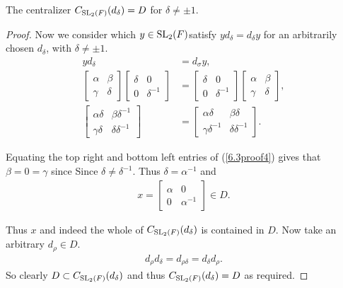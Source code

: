 \begin{proposition}
    \label{centralizer_d_eq_D}
    \leanok
    The centralizer $C_{\operatorname{SL}_2(F)}(d_\delta) = D$ for $\delta \neq \pm 1$.
    \end{proposition}        
\begin{proof}
    \leanok
Now we consider which $y \in \operatorname{SL}_2(F)$satisfy $y d_\delta = d_\delta y$ for an arbitrarily chosen $d_\delta$, with $\delta \neq \pm 1$.
\begin{align}\label{6.3proof4} y d_ \delta &= d_\sigma y, \nonumber \\[1.5ex]
\begin{bmatrix} \alpha & \beta \\ \gamma & \delta \end{bmatrix} \begin{bmatrix} \delta & 0 \\ 0 & \delta^{-1} \end{bmatrix} &= \begin{bmatrix} \delta & 0 \\ 0 & \delta^{-1} \end{bmatrix} \begin{bmatrix} \alpha & \beta \\ \gamma & \delta \end{bmatrix}, \nonumber \\[1.5ex]
\begin{bmatrix} \alpha \delta & \beta \delta^{-1} \\ \gamma \delta & \delta \delta^{-1} \end{bmatrix} &= \begin{bmatrix} \alpha \delta & \beta \delta \\ \gamma \delta^{-1} & \delta \delta^{-1} \end{bmatrix}.
\end{align}

Equating the top right and bottom left entries of (\ref{6.3proof4}) gives that $\beta = 0 = \gamma$ since Since $\delta \neq \delta^{-1}$. Thus $\delta = \alpha^{-1}$ and 
\begin{align*} x = \begin{bmatrix} \alpha & 0 \\ 0 & \alpha^{-1} \end{bmatrix} \in D. 
\end{align*}

Thus $x$ and indeed the whole of $C_{\operatorname{SL}_2(F)}(d_\delta)$ is contained in $D$. Now take an arbitrary $d_\rho \in D$.
\begin{align*} d_\rho d_\delta = d_{\rho \delta} = d_\delta d_\rho.
\end{align*}
So clearly $D \subset C_{\operatorname{SL}_2(F)}(d_\delta)$ and thus $C_{\operatorname{SL}_2(F)}(d_\delta) = D$ as required.
\end{proof}


